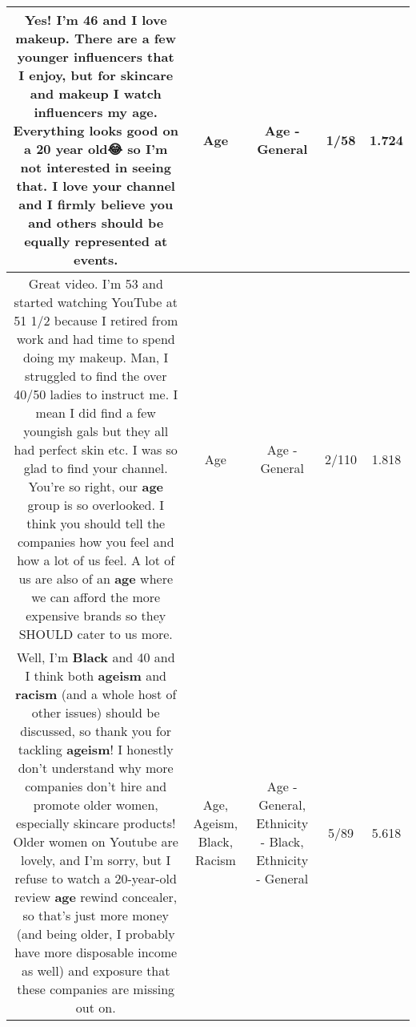 \documentclass[11pt]{article}
\newlength\mylength
\begin{document}
\begin{center}
\begin{longtable}{|C{.65\mylength}|C{.30\mylength}|C{.12\mylength}|C{.12\mylength}|C{.12\mylength}|}
  \small Yes!  I'm 46 and I love makeup.  There are a few younger influencers that I enjoy, but for skincare and makeup I watch influencers my \textbf{age}.  Everything looks good on a 20 year old😂 so I'm not interested in seeing that.  I love your channel and I firmly believe you and others should be equally represented at events.\normalsize   & Age & Age - General & 1/58 & 1.724 \\  \hline
  \small Great video. I'm 53 and started watching YouTube at 51 1/2 because I retired from work and had time to spend doing my makeup. Man, I struggled to find the over 40/50 ladies to  instruct me. I mean I did find a few youngish gals but they all had perfect skin etc. I was so glad to find your channel. You're so right, our \textbf{age} group is so overlooked. I think you should tell the companies how you feel and how a lot of us feel. A lot of us are also of an \textbf{age} where we can afford the more expensive brands so they SHOULD cater to us more.\normalsize   & Age & Age - General & 2/110 & 1.818 \\  \hline
  \small Well, I'm \textbf{Black} and 40 and I think both \textbf{ageism} and \textbf{racism} (and a whole host of other issues) should be discussed, so thank you for tackling \textbf{ageism}! I honestly don't understand why more companies don't hire and promote older women, especially skincare products! Older women on Youtube are lovely, and I'm sorry, but I refuse to watch a 20-year-old review \textbf{age} rewind concealer, so that's just more money (and being older, I probably have more disposable income as well) and exposure that these companies are missing out on.\normalsize   & Age, Ageism, Black, Racism & Age - General, Ethnicity - Black, Ethnicity - General & 5/89 & 5.618 \\  \hline

\end{longtable}
\end{center}
\end{document}
